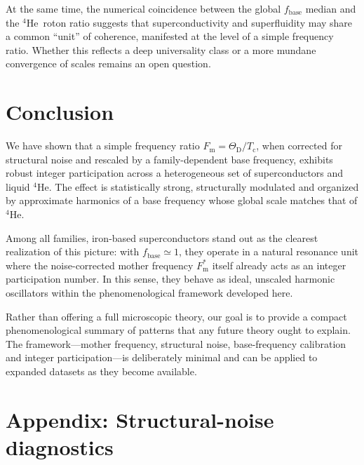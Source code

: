 \documentclass[aps,prb,twocolumn,superscriptaddress,floatfix,nofootinbib]{revtex4-2}
\newcommand{\Tc}{\ensuremath{T_{\mathrm{c}}}}
\newcommand{\ThetaD}{\ensuremath{\Theta_{\mathrm{D}}}}
\newcommand{\Fm}{\ensuremath{F_{\mathrm{m}}}}
\newcommand{\Fmstar}{\ensuremath{{F_{\mathrm{m}}^{\ast}}}}
\newcommand{\fbase}{\ensuremath{{f_{\mathrm{base}}}}}
\newcommand{\He}{\ensuremath{\mathrm{He}}}
\newcommand{\HeFour}{\ensuremath{{^{4}\He}}}
\begin{document}
At the same time, the numerical coincidence between the global
$\fbase$ median and the \HeFour\ roton ratio suggests that
superconductivity and superfluidity may share a common ``unit''
of coherence, manifested at the level of a simple frequency ratio.
Whether this reflects a deep universality class or a more mundane
convergence of scales remains an open question.

\section{Conclusion}
\label{sec:conclusion}

We have shown that a simple frequency ratio
$\Fm = \ThetaD / \Tc$, when corrected for structural noise
and rescaled by a family-dependent base frequency,
exhibits robust integer participation across a heterogeneous set
of superconductors and liquid \HeFour.
The effect is statistically strong, structurally modulated and
organized by approximate harmonics of a base frequency whose global
scale matches that of \HeFour.

Among all families, iron-based superconductors stand out as the
clearest realization of this picture: with $\fbase \simeq 1$,
they operate in a natural resonance unit where the noise-corrected
mother frequency $\Fmstar$ itself already acts as an integer
participation number.
In this sense, they behave as ideal, unscaled harmonic oscillators
within the phenomenological framework developed here.

Rather than offering a full microscopic theory, our goal is to
provide a compact phenomenological summary of patterns that any
future theory ought to explain.
The framework---mother frequency, structural noise, base-frequency
calibration and integer participation---is deliberately minimal
and can be applied to expanded datasets as they become available.

\clearpage
\appendix

\onecolumngrid 

\section*{Appendix: Structural-noise diagnostics}
\end{document}
